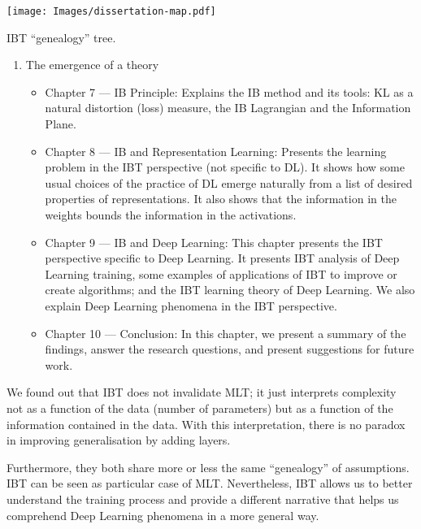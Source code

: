 \documentclass[
  letterpaper,
  12pt,
  british]{tufte-book}
\theoremstyle{plain}
\theoremstyle{definition}
\theoremstyle{plain}
\theoremstyle{remark}
\begin{document}
\begin{marginfigure}

{\centering \texttt{[image: Images/dissertation-map.pdf]}

}

\caption{IBT ``genealogy'' tree.}

\end{marginfigure}

\begin{enumerate}
\def\labelenumi{\arabic{enumi}.}
\setcounter{enumi}{2}
\item
  The emergence of a theory

  \begin{itemize}
  \item
    Chapter 7 --- IB Principle: Explains the IB method and its tools:
    {KL} as a natural distortion (loss) measure, the IB Lagrangian and
    the Information Plane.
  \item
    Chapter 8 --- IB and Representation Learning: Presents the learning
    problem in the {IBT} perspective (not specific to {DL}). It shows
    how some usual choices of the practice of {DL} emerge naturally from
    a list of desired properties of representations. It also shows that
    the information in the weights bounds the information in the
    activations.
  \item
    Chapter 9 --- IB and Deep Learning: This chapter presents the {IBT}
    perspective specific to Deep Learning. It presents {IBT} analysis of
    Deep Learning training, some examples of applications of {IBT} to
    improve or create algorithms; and the {IBT} learning theory of Deep
    Learning. We also explain Deep Learning phenomena in the {IBT}
    perspective.
  \item
    Chapter 10 --- Conclusion: In this chapter, we present a summary of
    the findings, answer the research questions, and present suggestions
    for future work.
  \end{itemize}
\end{enumerate}

We found out that {IBT} does not invalidate {MLT}; it just interprets
complexity not as a function of the data (number of parameters) but as a
function of the information contained in the data. With this
interpretation, there is no paradox in improving generalisation by
adding layers.

Furthermore, they both share more or less the same ``genealogy'' of
assumptions. {IBT} can be seen as particular case of {MLT}.
Nevertheless, {IBT} allows us to better understand the training process
and provide a different narrative that helps us comprehend Deep Learning
phenomena in a more general way.
\end{document}
